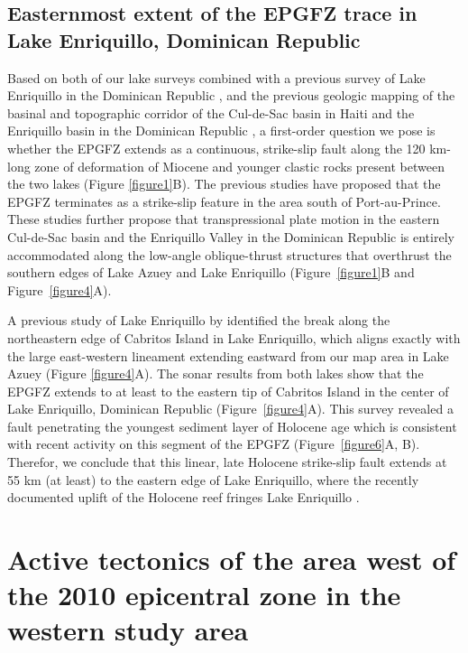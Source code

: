 \documentclass[linenumbers,draft]{agujournal}
\begin{document}
\subsection{Easternmost extent of the EPGFZ trace in Lake Enriquillo, Dominican Republic}
Based on both of our lake surveys combined with a previous survey of Lake Enriquillo in the Dominican Republic \citep{rios2013holocene}, and the previous geologic mapping of the basinal and topographic corridor of the Cul-de-Sac basin in Haiti and the Enriquillo basin in the Dominican Republic \citep{mann1995actively,mann1999caribbean}, a first-order question we pose is whether the EPGFZ extends as a continuous, strike-slip fault along the 120 km-long zone of deformation of Miocene and younger clastic rocks present between the two lakes (Figure \ref{figure1}B). The previous studies \citep{saint2015seismotectonics,symithe2016present} have proposed that the EPGFZ terminates as a strike-slip feature in the area south of Port-au-Prince. These studies further propose that transpressional plate motion in the eastern Cul-de-Sac basin and the Enriquillo Valley in the Dominican Republic is entirely accommodated along the low-angle oblique-thrust structures that overthrust the southern edges of Lake Azuey and Lake Enriquillo (Figure~\ref{figure1}B and Figure~\ref{figure4}A). 

A previous study of Lake Enriquillo by \citet{rios2013holocene} identified the break along the northeastern edge of Cabritos Island in Lake Enriquillo, which aligns exactly with the large east-western lineament extending eastward from our map area in Lake Azuey (Figure \ref{figure4}A). The sonar results from both lakes show that the EPGFZ extends to at least to the eastern tip of Cabritos Island in the center of Lake Enriquillo, Dominican Republic \citep{mann1995actively} (Figure~\ref{figure4}A). This survey revealed a fault penetrating the youngest sediment layer of Holocene age which is consistent with recent activity on this segment of the EPGFZ (Figure~\ref{figure6}A, B). Therefor, we conclude that this linear, late Holocene strike-slip fault extends at 55 km (at least) to the eastern edge of Lake Enriquillo, where the recently documented uplift of the Holocene reef fringes Lake Enriquillo \citep{mann1995actively}.

\section{Active tectonics of the area west of the 2010 epicentral zone in the western study area}
\end{document}
